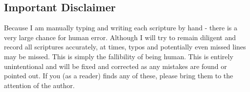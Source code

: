 \subsection*{Important Disclaimer}

Because I am manually typing and writing each scripture by hand - there is a very large chance for human error. Although I will try to remain diligent and record all scriptures accurately, at times, typos and potentially even missed lines may be missed. This is simply the fallibility of being human. This is entirely unintentional and will be fixed and corrected as any mistakes are found or pointed out. If you (as a reader) finds any of these, please bring them to the attention of the author.
